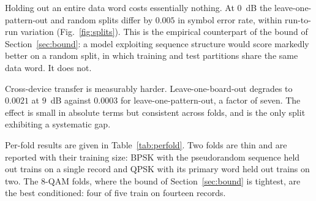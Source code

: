 \documentclass[journal]{IEEEtran}   %
\begin{document}
Holding out an entire data word costs essentially nothing. At $0$~dB the
leave-one-pattern-out and random splits differ by $0.005$ in symbol error rate,
within run-to-run variation (Fig.~\ref{fig:splits}). This is the empirical
counterpart of the bound of Section~\ref{sec:bound}: a model exploiting sequence
structure would score markedly better on a random split, in which training and
test partitions share the same data word. It does not.

Cross-device transfer is measurably harder. Leave-one-board-out degrades to
$0.0021$ at $9$~dB against $0.0003$ for leave-one-pattern-out, a factor of
seven. The effect is small in absolute terms but consistent across folds, and is
the only split exhibiting a systematic gap.


Per-fold results are given in Table~\ref{tab:perfold}. Two folds are thin and
are reported with their training size: BPSK with the pseudorandom sequence held
out trains on a single record and QPSK with its primary word held out trains on
two. The 8-QAM folds, where the bound of Section~\ref{sec:bound} is tightest,
are the best conditioned: four of five train on fourteen records.
\end{document}
